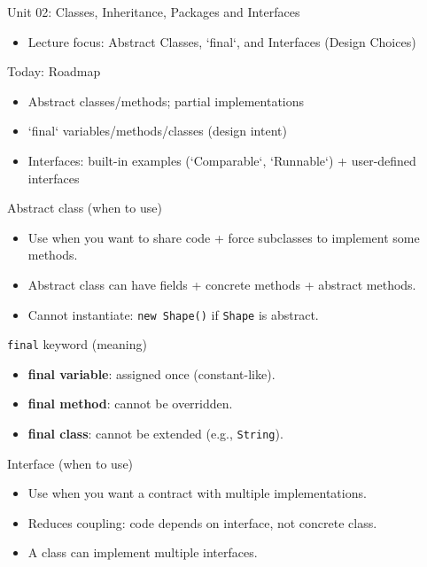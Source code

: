 \documentclass{beamer}
\begin{document}
\begin{frame}{Unit 02: Classes, Inheritance, Packages and Interfaces}
  \begin{itemize}[<+->]
    \item Lecture focus: Abstract Classes, `final`, and Interfaces (Design Choices)
  \end{itemize}
  \slidesources{\OOPSUnitIISources}
\end{frame}

\begin{frame}{Today: Roadmap}
  \begin{itemize}[<+->]
    \item Abstract classes/methods; partial implementations
    \item `final` variables/methods/classes (design intent)
    \item Interfaces: built-in examples (`Comparable`, `Runnable`) + user-defined interfaces
  \end{itemize}
  \slidesources{\OOPSUnitIISources}
\end{frame}

\begin{frame}{Abstract class (when to use)}
  \begin{itemize}[<+->]
    \item Use when you want to share code + force subclasses to implement some methods.
    \item Abstract class can have fields + concrete methods + abstract methods.
    \item Cannot instantiate: \texttt{new Shape()} if \texttt{Shape} is abstract.
  \end{itemize}
  \slidesources{\OOPSUnitIISources}
\end{frame}

\begin{frame}{\texttt{final} keyword (meaning)}
  \begin{itemize}[<+->]
    \item \textbf{final variable}: assigned once (constant-like).
    \item \textbf{final method}: cannot be overridden.
    \item \textbf{final class}: cannot be extended (e.g., \texttt{String}).
  \end{itemize}
  \slidesources{\OOPSUnitIISources}
\end{frame}

\begin{frame}{Interface (when to use)}
  \begin{itemize}[<+->]
    \item Use when you want a contract with multiple implementations.
    \item Reduces coupling: code depends on interface, not concrete class.
    \item A class can implement multiple interfaces.
  \end{itemize}
  \slidesources{\OOPSUnitIISources}
\end{frame}
\end{document}
